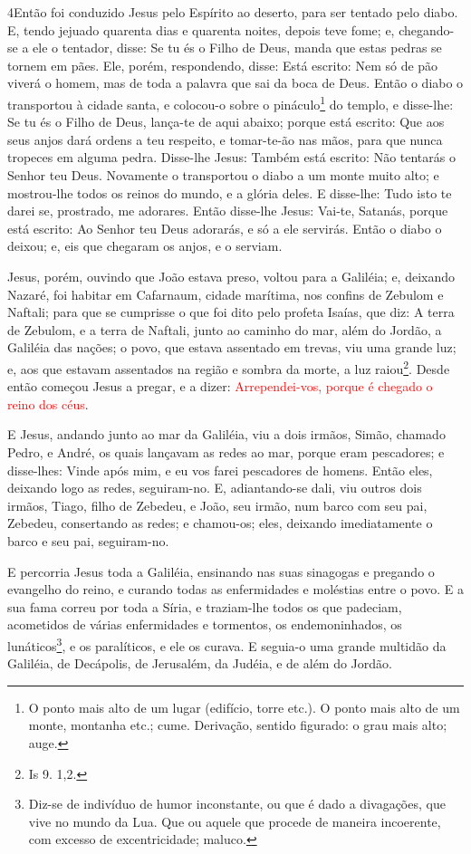 \medskip

\lettrine{4} Então foi conduzido Jesus pelo Espírito ao
deserto, para ser tentado pelo diabo. E, tendo jejuado quarenta
dias e quarenta noites, depois teve fome; e, chegando-se a ele o
tentador, disse: Se tu és o Filho de Deus, manda que estas pedras se
tornem em pães. Ele, porém, respondendo, disse: Está escrito:
Nem só de pão viverá o homem, mas de toda a palavra que sai da boca
de Deus. Então o diabo o transportou à cidade santa, e colocou-o
sobre o pináculo\footnote{O ponto mais alto de um lugar (edifício,
torre etc.). O ponto mais alto de um monte, montanha etc.; cume.
Derivação, sentido figurado: o grau mais alto; auge.} do templo,
e disse-lhe: Se tu és o Filho de Deus, lança-te de aqui abaixo;
porque está escrito: Que aos seus anjos dará ordens a teu respeito,
e tomar-te-ão nas mãos, para que nunca tropeces em alguma pedra.
Disse-lhe Jesus: Também está escrito: Não tentarás o Senhor teu
Deus. Novamente o transportou o diabo a um monte muito alto; e
mostrou-lhe todos os reinos do mundo, e a glória deles. E
disse-lhe: Tudo isto te darei se, prostrado, me adorares.
Então disse-lhe Jesus: Vai-te, Satanás, porque está escrito:
Ao Senhor teu Deus adorarás, e só a ele servirás. Então o
diabo o deixou; e, eis que chegaram os anjos, e o serviam.

Jesus, porém, ouvindo que João estava preso, voltou para a
Galiléia; e, deixando Nazaré, foi habitar em Cafarnaum,
cidade marítima, nos confins de Zebulom e Naftali; para que
se cumprisse o que foi dito pelo profeta Isaías, que diz: A
terra de Zebulom, e a terra de Naftali, junto ao caminho do mar,
além do Jordão, a Galiléia das nações; o povo, que estava
assentado em trevas, viu uma grande luz; e, aos que estavam
assentados na região e sombra da morte, a luz raiou\footnote{Is 9.
1,2.}. Desde então começou Jesus a pregar, e a dizer:
\textcolor{red}{Arrependei-vos, porque é chegado o reino dos céus}.

E Jesus, andando junto ao mar da Galiléia, viu a dois irmãos,
Simão, chamado Pedro, e André, os quais lançavam as redes ao mar,
porque eram pescadores; e disse-lhes: Vinde após mim, e eu
vos farei pescadores de homens. Então eles, deixando logo as
redes, seguiram-no. E, adiantando-se dali, viu outros dois
irmãos, Tiago, filho de Zebedeu, e João, seu irmão, num barco com
seu pai, Zebedeu, consertando as redes; e chamou-os; eles,
deixando imediatamente o barco e seu pai, seguiram-no.

E percorria Jesus toda a Galiléia, ensinando nas suas sinagogas e
pregando o evangelho do reino, e curando todas as enfermidades e
moléstias entre o povo. E a sua fama correu por toda a Síria,
e traziam-lhe todos os que padeciam, acometidos de várias
enfermidades e tormentos, os endemoninhados, os
lunáticos\footnote{Diz-se de indivíduo de humor inconstante, ou que
é dado a divagações, que vive no mundo da Lua. Que ou aquele que
procede de maneira incoerente, com excesso de excentricidade;
maluco.}, e os paralíticos, e ele os curava. E seguia-o uma
grande multidão da Galiléia, de Decápolis, de Jerusalém, da Judéia,
e de além do Jordão.

